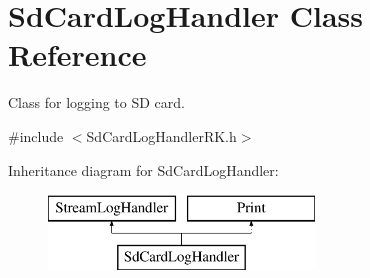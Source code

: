 \hypertarget{class_sd_card_log_handler}{}\section{Sd\+Card\+Log\+Handler Class Reference}
\label{class_sd_card_log_handler}


Class for logging to SD card.  




{\ttfamily \#include $<$Sd\+Card\+Log\+Handler\+R\+K.\+h$>$}

Inheritance diagram for Sd\+Card\+Log\+Handler\+:\begin{figure}[H]
\begin{center}
\leavevmode
\includegraphics[height=2.000000cm]{class_sd_card_log_handler}
\end{center}
\end{figure}

